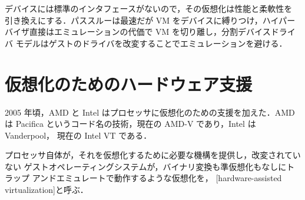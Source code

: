 \documentclass[../main.tex]{subfiles}
\begin{document}
\begin{keypoint}
  デバイスには標準のインタフェースがないので，その仮想化は性能と柔軟性を
  引き換えにする．パススルーは最速だが VM をデバイスに縛りつけ，ハイパー
  バイザ直接はエミュレーションの代価で VM を切り離し，分割デバイスドライバ
  モデルはゲストのドライバを改変することでエミュレーションを避ける．
\end{keypoint}

\section{仮想化のためのハードウェア支援}
\label{sec:l12-hw}

2005 年頃，AMD と Intel はプロセッサに仮想化のための支援を加えた．AMD は
Pacifica というコード名の技術，現在の AMD-V であり，Intel は Vanderpool，
現在の Intel VT である．

\begin{definition}[ハードウェア支援仮想化]
  プロセッサ自体が，それを仮想化するために必要な機構を提供し，改変されていない
  ゲストオペレーティングシステムが，バイナリ変換も準仮想化もなしにトラップ
  アンドエミュレートで動作するような仮想化を，
  [hardware-assisted virtualization]と呼ぶ．
\end{definition}
\end{document}

